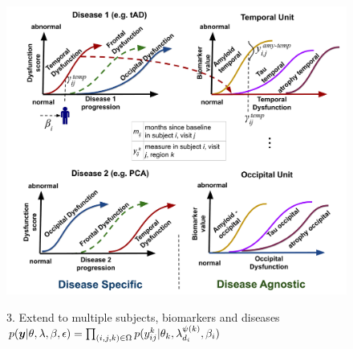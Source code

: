 \documentclass[portrait,a0,final,20pt]{a0poster}
\newcommand{\fnt}[1]{\LARGE{#1}}
\begin{document}
{\begin{multicols}{2}
\begin{figure}[H]
\begin{subfigure}{0.49\columnwidth}
  \end{subfigure}

 \includegraphics[width=\columnwidth,trim=0 0 0 00,clip]{disease_knowledge_transfer_poster.pdf}

 
  \fnt{3. Extend to multiple subjects, biomarkers and diseases}\\
 $ p(\boldsymbol{y}|\theta, \lambda, \beta , \epsilon) = \prod_{(i,j,k) \in \Omega} p(y_{ij}^k|\theta_k, \lambda_{d_i}^{\psi(k)}, \beta_{i}) $
 \end{figure}


\columnbreak




\newcommand{\uu}{^{(u)}}
\newcommand{\um}{^{(u-1)}}

\newcommand{\algoFnt}[1]{\Large{#1}}



\end{multicols}}
\end{document}
